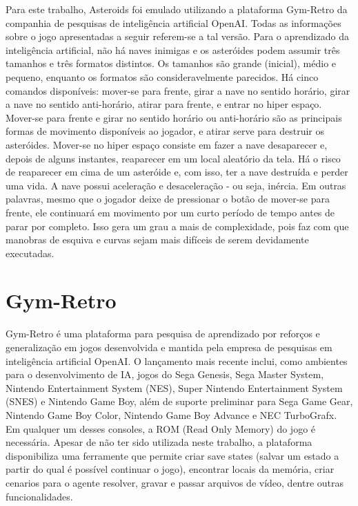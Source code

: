 Para este trabalho, Asteroids foi emulado utilizando a plataforma Gym-Retro da companhia de pesquisas de inteligência artificial OpenAI. Todas as informações sobre o jogo apresentadas a seguir referem-se a tal versão.
Para o aprendizado da inteligência artificial, não há naves inimigas e os asteróides podem assumir três tamanhos e três formatos distintos. Os tamanhos são grande (inicial), médio e pequeno, enquanto os formatos são consideravelmente parecidos.
Há cinco comandos disponíveis: mover-se para frente, girar a nave no sentido horário, girar a nave no sentido anti-horário, atirar para frente, e entrar no hiper espaço. Mover-se para frente e girar no sentido horário ou anti-horário são as principais formas de movimento disponíveis ao jogador, e atirar serve para destruir os asteróides. Mover-se no hiper espaço consiste em fazer a nave desaparecer e, depois de alguns instantes, reaparecer em um local aleatório da tela. Há o risco de reaparecer em cima de um asteróide e, com isso, ter a nave destruída e perder uma vida.
A nave possui aceleração e desaceleração - ou seja, inércia. Em outras palavras, mesmo que o jogador deixe de pressionar o botão de mover-se para frente, ele continuará em movimento por um curto período de tempo antes de parar por completo. Isso gera um grau a mais de complexidade, pois faz com que manobras de esquiva e curvas sejam mais difíceis de serem devidamente executadas.

\section{Gym-Retro}
\label{sec:gymretro}

Gym-Retro é uma plataforma para pesquisa de aprendizado por reforços e generalização em jogos desenvolvida e mantida pela empresa de pesquisas em inteligência artificial OpenAI. O lançamento mais recente inclui, como ambientes para o desenvolvimento de IA, jogos do Sega Genesis, Sega Master System, Nintendo Entertainment System (NES), Super Nintendo Entertainment System (SNES) e Nintendo Game Boy, além de suporte preliminar para Sega Game Gear, Nintendo Game Boy Color, Nintendo Game Boy Advance e NEC TurboGrafx. Em qualquer um desses consoles, a ROM (Read Only Memory) do jogo é necessária.
Apesar de não ter sido utilizada neste trabalho, a plataforma disponibiliza uma ferramente que permite criar save states (salvar um estado a partir do qual é possível continuar o jogo), encontrar locais da memória, criar cenarios para o agente resolver, gravar e passar arquivos de vídeo, dentre outras funcionalidades.


